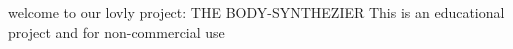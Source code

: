 \label{index_md_mainpage}%
%
welcome to our lovly project\+: THE BODY-\/\+SYNTHEZIER This is an educational project and for non-\/commercial use 